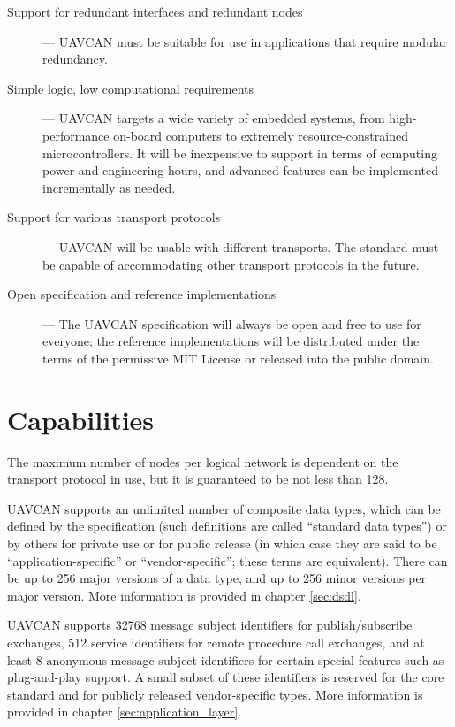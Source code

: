 \begin{description}
    \item[Support for redundant interfaces and redundant nodes] --- UAVCAN must be suitable for use in
    applications that require modular redundancy.

    \item[Simple logic, low computational requirements] --- UAVCAN targets a wide variety of embedded systems,
    from high-performance on-board computers to extremely resource-constrained microcontrollers.
    It will be inexpensive to support in terms of computing power and engineering hours,
    and advanced features can be implemented incrementally as needed.

    \item[Support for various transport protocols] --- UAVCAN will be usable with different transports.
    The standard must be capable of accommodating other transport protocols in the future.

    \item[Open specification and reference implementations] --- The UAVCAN specification will always be open and
    free to use for everyone; the reference implementations will be distributed under the terms of
    the permissive MIT License or released into the public domain.
\end{description}

\section{Capabilities}

The maximum number of nodes per logical network is dependent on the transport protocol in use,
but it is guaranteed to be not less than 128.

UAVCAN supports an unlimited number of composite data types,
which can be defined by the specification (such definitions are called ``standard data types'')
or by others for private use or for public release
(in which case they are said to be ``application-specific'' or ``vendor-specific''; these terms are equivalent).
There can be up to 256 major versions of a data type, and up to 256 minor versions per major version.
More information is provided in chapter \ref{sec:dsdl}.

UAVCAN supports 32768 message subject identifiers for publish/subscribe exchanges,
512 service identifiers for remote procedure call exchanges,
and at least 8 anonymous message subject identifiers for certain special features such as plug-and-play support.
A small subset of these identifiers is reserved for the core standard and for publicly released vendor-specific types.
More information is provided in chapter \ref{sec:application_layer}.

